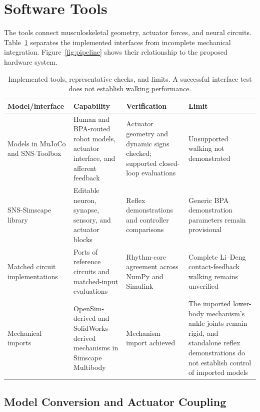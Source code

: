 \section{Software Tools}\label{sec:preliminary_sim_methods}

The tools connect musculoskeletal geometry, actuator forces, and neural circuits. Table~\ref{tab:sns_capability} separates the implemented interfaces from incomplete mechanical integration. Figure~\ref{fig:pipeline} shows their relationship to the proposed hardware system.

\begin{table}[htbp]
\caption[Neuromechanical tools and verification scope]{Implemented tools, representative checks, and limits. A successful interface test does not establish walking performance.}
\label{tab:sns_capability}
\small
\begin{tabularx}{\textwidth}{@{}>{\raggedright\arraybackslash}p{}*{3}{>{\raggedright\arraybackslash}X}@{}}
\toprule
\textbf{Model/interface} & \textbf{Capability} & \textbf{Verification} & \textbf{Limit} \\
\midrule
Models in MuJoCo and SNS-Toolbox & Human and BPA-routed robot models, actuator interface, and afferent feedback & Actuator geometry and dynamic signs checked; supported closed-loop evaluations & Unsupported walking not demonstrated \\
SNS-Simscape library & Editable neuron, synapse, sensory, and actuator blocks & Reflex demonstrations and controller comparisons & Generic BPA demonstration parameters remain provisional \\
Matched circuit implementations & Ports of reference circuits and matched-input evaluations & Rhythm-core agreement across NumPy and Simulink & Complete Li--Deng contact-feedback walking remains unverified \\
Mechanical imports & OpenSim-derived and SolidWorks-derived mechanisms in Simscape Multibody & Mechanism import achieved & The imported lower-body mechanism's ankle joints remain rigid, and standalone reflex demonstrations do not establish control of imported models \\
\bottomrule
\end{tabularx}
\end{table}

\subsection{Model Conversion and Actuator Coupling}\label{sec:sns_existing_tools}

